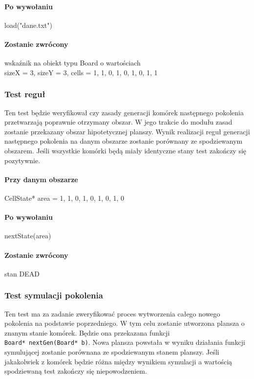\documentclass{mwart}
\begin{document}
\paragraph{Po wywołaniu} load("dane.txt")
\paragraph{Zostanie zwrócony} wskaźnik na obiekt typu Board o wartościach \\ sizeX = 3, sizeY = 3, cells = {1, 1, 0, 1, 0, 1, 0, 1, 1 }

\subsubsection{Test reguł} 
Ten test będzie weryfikował czy zasady generacji komórek następnego pokolenia przetwarzają poprawnie otrzymany obszar. W jego trakcie do modułu zasad zostanie przekazany obszar hipotetycznej planszy. Wynik realizacji reguł generacji następnego pokolenia na danym obszarze zostanie porównany ze spodziewanym obszarem. Jeśli wszystkie komórki będą miały identyczne stany test zakończy się pozytywnie.

\paragraph{Przy danym obszarze} CellState* area = {1, 1, 0, 1, 0, 1, 0, 1, 0}
\paragraph{Po wywołaniu} nextState(area)
\paragraph{Zostanie zwrócony} stan DEAD

\subsubsection{Test symulacji pokolenia} 
Ten test ma za zadanie zweryfikować proces wytworzenia całego nowego pokolenia na podstawie poprzedniego. W tym celu zostanie utworzona plansza o znanym stanie komórek. Będzie ona przekazana funkcji \\ \texttt{Board* nextGen(Board* b)}. Nowa plansza powstała w wyniku działania funkcji symulującej zostanie porównana ze spodziewanym stanem planszy. Jeśli jakakolwiek z komórek będzie różna między wynikiem symulacji a wartością spodziewaną test zakończy się niepowodzeniem.
\end{document}
